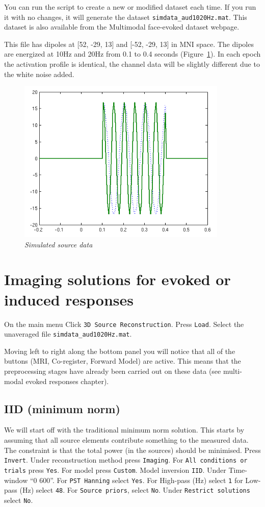 You can run the script to create a new or modified dataset each time. If you run it with no changes, it will generate the dataset \texttt{simdata\_aud1020Hz.mat}. This dataset is also available from the Multimodal face-evoked dataset webpage.

This file has dipoles at [52, -29, 13] and  [-52, -29, 13] in MNI space. The dipoles are energized at 10Hz and 20Hz from 0.1 to 0.4 seconds (Figure~\ref{meg_sloc:fig:1}). In each epoch the activation profile is identical, the channel data will be slightly different due to the white noise added.

\begin{figure}
\begin{center}
\includegraphics[width=100mm]{meg_sloc/slide1}
\caption{\em Simulated source data \label{meg_sloc:fig:1}}
\end{center}
\end{figure}

\section{Imaging solutions for evoked or induced responses}

On the main menu Click \texttt{3D Source Reconstruction}. Press \texttt{Load}. Select the unaveraged file \texttt{simdata\_aud1020Hz.mat}.

Moving left to right along the bottom panel you will notice that all of the buttons (MRI, Co-register, Forward Model) are active. This means that the preprocessing stages have already been carried out on these data (see multi-modal evoked responses chapter).

\subsection{IID (minimum norm)}
We will start off with the traditional minimum norm solution. This starts by assuming that all source elements contribute something to the measured data. The constraint is that the total power (in the sources) should be minimised.
Press \texttt{Invert}. Under reconstruction method press \texttt{Imaging}. For \texttt{All conditions or trials} press \texttt{Yes}. For model press \texttt{Custom}. Model inversion \texttt{IID}. Under Time-window ``0 600''. For \texttt{PST Hanning} select \texttt{Yes}. For High-pass (Hz) select \texttt{1} for Low-pass (Hz) select \texttt{48}. For \texttt{Source priors}, select \texttt{No}. Under \texttt{Restrict solutions} select \texttt{No}. 

